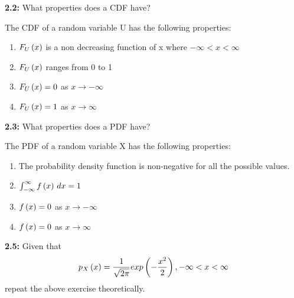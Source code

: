 \documentclass[journal,12pt,two column]{IEEEtran}
\begin{document}
\textbf{2.2:} What properties does a CDF have?

\solution
The CDF of a random variable U has the following properties:
\begin{enumerate}
    \item $F_{U}\left(x\right)$ is a non decreasing function of x where $-\infty < x < \infty$ 
    \item $F_{U}\left(x\right)$ ranges from 0 to 1 
    \item $F_{U}\left(x\right) = 0$ as $x \rightarrow -\infty$ 
    \item $F_{U}\left(x\right) = 1$ as $x \rightarrow \infty$
\end{enumerate}

\textbf{2.3:} What properties does a PDF have?

\solution
The PDF of a random variable X has the following properties:
\begin{enumerate}
    \item The probability density function is non-negative for all the possible values. \\
    \item $ \int_{-\infty}^{\infty} f\left(x\right) \,dx  = 1 $ 
    \item $f\left(x\right) = 0$ as $x \rightarrow -\infty$
    \item $f\left(x\right) = 0$ as $x \rightarrow \infty$
\end{enumerate}

\textbf{2.5:} Given that
\begin{equation}
    p_{X}\left(x\right) = \frac{1}{\sqrt{2\pi}}exp\left(-\frac{x^2}{2}\right) ,  -\infty < x < \infty
\end{equation}
repeat the above exercise theoretically.
\end{document}
